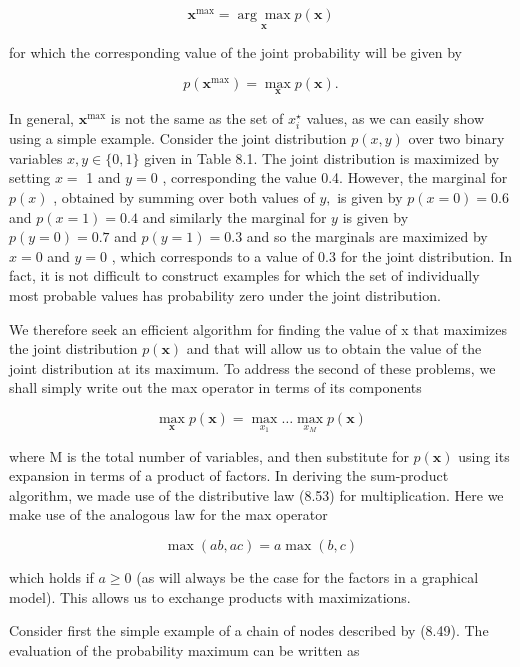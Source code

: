 \documentclass[
  10
]{article}
\begin{document}
\[
\mathbf {x} ^ {\max} = \underset {\mathbf {x}} {\arg \max} p (\mathbf {x})\tag{8.87}
\]

for which the corresponding value of the joint probability will be given
by

\[
p (\mathbf {x} ^ {\max}) = \max _ {\mathbf {x}} p (\mathbf {x}).\tag{8.88}
\]

In general, \(\mathbf { x } ^ { \mathrm { { m a x } } }\) is not the
same as the set of \(x _ { i } ^ { \star }\) values, as we can easily
show using a simple example. Consider the joint distribution
\(p ( x , y )\) over two binary variables \(x , y \in \{ 0 , 1 \}\)
given in Table 8.1. The joint distribution is maximized by setting
\(x =\) 1 and \(y = 0\) , corresponding the value 0.4. However, the
marginal for \(p ( x )\) , obtained by summing over both values of
\(y ,\) is given by \(p ( x = 0 ) = 0 . 6\) and \(p ( x = 1 ) = 0 . 4\)
and similarly the marginal for \(y\) is given by \(p ( y = 0 ) = 0 . 7\)
and \(p ( y = 1 ) = 0 . 3\) and so the marginals are maximized by
\(x = 0\) and \(y = 0\) , which corresponds to a value of 0.3 for the
joint distribution. In fact, it is not difficult to construct examples
for which the set of individually most probable values has probability
zero under the joint distribution.

We therefore seek an efficient algorithm for finding the value of x that
maximizes the joint distribution \(p ( \mathbf { x } )\) and that will
allow us to obtain the value of the joint distribution at its maximum.
To address the second of these problems, we shall simply write out the
max operator in terms of its components

\[
\max _ {\mathbf {x}} p (\mathbf {x}) = \max _ {x _ {1}} \ldots \max _ {x _ {M}} p (\mathbf {x})\tag{8.89}
\]

where M is the total number of variables, and then substitute for
\(p ( \mathbf { x } )\) using its expansion in terms of a product of
factors. In deriving the sum-product algorithm, we made use of the
distributive law (8.53) for multiplication. Here we make use of the
analogous law for the max operator

\[
\max (a b, a c) = a \max (b, c)\tag{8.90}
\]

which holds if \(a \geqslant 0\) (as will always be the case for the
factors in a graphical model). This allows us to exchange products with
maximizations.

Consider first the simple example of a chain of nodes described by
(8.49). The evaluation of the probability maximum can be written as
\end{document}
